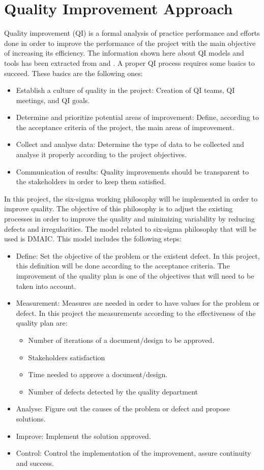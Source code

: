 \section{Quality Improvement Approach}
Quality improvement (QI) is a formal analysis of practice performance and efforts done in order to improve the performance of the project with the main objective of increasing its efficiency. The information shown here about QI models and tools has been extracted from \cite{aafp} and \cite{leansolutions}. A proper QI process requires some basics to succeed. These basics are the following ones:
\begin{itemize}
\item Establish a culture of quality in the project: Creation of QI teams, QI meetings, and QI goals.
\item Determine and prioritize potential areas of improvement: Define, according to the acceptance criteria of the project, the main areas of improvement.
\item Collect and analyse data: Determine the type of data to be collected and analyse it properly according to the project objectives.
\item Communication of results: Quality improvements should be transparent to the stakeholders in order to keep them satisfied. 
\end{itemize}
In this project, the six-sigma working philosophy will be implemented in order to improve quality. The objective of this philosophy is to adjust the existing processes in order to improve the quality and minimizing variability by reducing defects and irregularities. The model related to six-sigma philosophy that will be used is DMAIC. This model includes the following steps:
\begin{itemize}
\item Define: Set the objective of the problem or the existent defect. In this project, this definition will be done according to the acceptance criteria. The improvement of the quality plan is one of the objectives that will need to be taken into account.
\item Measurement: Measures are needed in order to have values for the problem or defect. In this project the measurements according to the effectiveness of the quality plan are:
\begin{itemize}
\item Number of iterations of a document/design to be approved.
\item Stakeholders satisfaction
\item Time needed to approve a document/design.
\item Number of defects detected by the quality department 
\end{itemize}
\item Analyse: Figure out the causes of the problem or defect and propose solutions.
\item Improve: Implement the solution approved.
\item Control: Control the implementation of the improvement, assure continuity and success.
\end{itemize}
